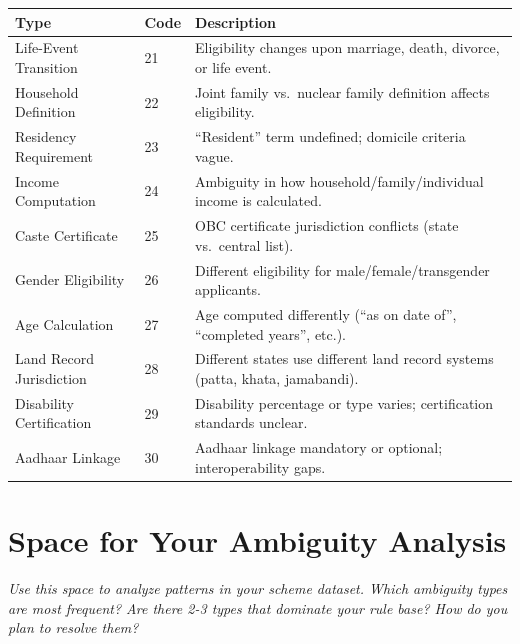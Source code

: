 \documentclass[11pt,a4paper]{report}
\newenvironment{notebox}{%
  \begin{callout}%
}{%
  \end{callout}%
}
\begin{document}
\begin{center}
\small
\begin{tabularx}{\textwidth}{lp{1.2cm}p{6cm}}
\toprule
\textbf{Type} & \textbf{Code} & \textbf{Description} \\
\midrule
Life-Event Transition & 21 & Eligibility changes upon marriage, death, divorce, or life event. \\
Household Definition & 22 & Joint family vs.\ nuclear family definition affects eligibility. \\
Residency Requirement & 23 & ``Resident'' term undefined; domicile criteria vague. \\
Income Computation & 24 & Ambiguity in how household/family/individual income is calculated. \\
Caste Certificate & 25 & OBC certificate jurisdiction conflicts (state vs.\ central list). \\
Gender Eligibility & 26 & Different eligibility for male/female/transgender applicants. \\
Age Calculation & 27 & Age computed differently (``as on date of'', ``completed years'', etc.). \\
Land Record Jurisdiction & 28 & Different states use different land record systems (patta, khata, jamabandi). \\
Disability Certification & 29 & Disability percentage or type varies; certification standards unclear. \\
Aadhaar Linkage & 30 & Aadhaar linkage mandatory or optional; interoperability gaps. \\
\bottomrule
\end{tabularx}
\end{center}

\section{Space for Your Ambiguity Analysis}

\begin{notebox}
\Large\vspace{3cm}

\noindent\textcolor{dark}{\emph{Use this space to analyze patterns in your scheme dataset. Which ambiguity types are most frequent? Are there 2-3 types that dominate your rule base? How do you plan to resolve them?}}

\vspace{3cm}
\end{notebox}

\end{document}
